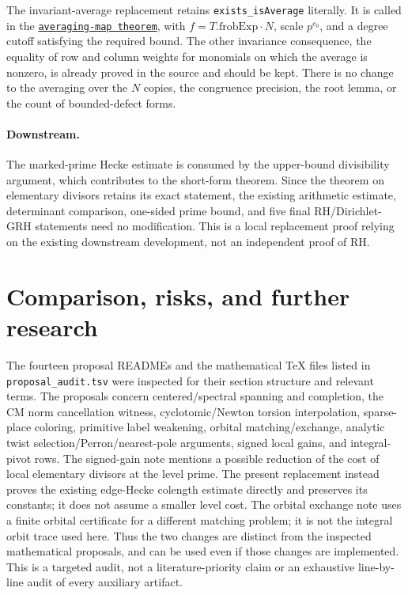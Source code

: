 \documentclass[11pt]{article}
\newcommand{\src}[1]{\texttt{#1}}
\newcommand{\anchor}[3]{\href{https://github.com/VladimirReshetnikov/ProveIt/blob/17bf37ab3b6740d5d7430065d2f2a1a2a03e8a0e/Analysis/GeneralizedRiemannHypothesis/Lean/grh/src/#1.lean\#L#2}{\texttt{#3}}}
\begin{document}
The invariant-average replacement retains \src{exists\_isAverage} literally. It is called in the \anchor{New/UpperBound/ElementaryDivisors/AveragingMap}{579}{averaging-map theorem}, with $f=T.\mathrm{frobExp}\cdot N$, scale $p^{c_0}$, and a degree cutoff satisfying the required bound. The other invariance consequence, the equality of row and column weights for monomials on which the average is nonzero, is already proved in the source and should be kept. There is no change to the averaging over the $N$ copies, the congruence precision, the root lemma, or the count of bounded-defect forms.

\paragraph{Downstream.} The marked-prime Hecke estimate is consumed by the upper-bound divisibility argument, which contributes to the short-form theorem. Since the theorem on elementary divisors retains its exact statement, the existing arithmetic estimate, determinant comparison, one-sided prime bound, and five final RH/Dirichlet-GRH statements need no modification. This is a local replacement proof relying on the existing downstream development, not an independent proof of RH.

\section{Comparison, risks, and further research}
The fourteen proposal READMEs and the mathematical TeX files listed in \src{proposal\_audit.tsv} were inspected for their section structure and relevant terms. The proposals concern centered/spectral spanning and completion, the CM norm cancellation witness, cyclotomic/Newton torsion interpolation, sparse-place coloring, primitive label weakening, orbital matching/exchange, analytic twist selection/Perron/nearest-pole arguments, signed local gains, and integral-pivot rows. The signed-gain note mentions a possible reduction of the cost of local elementary divisors at the level prime. The present replacement instead proves the existing edge-Hecke colength estimate directly and preserves its constants; it does not assume a smaller level cost. The orbital exchange note uses a finite orbital certificate for a different matching problem; it is not the integral orbit trace used here. Thus the two changes are distinct from the inspected mathematical proposals, and can be used even if those changes are implemented. This is a targeted audit, not a literature-priority claim or an exhaustive line-by-line audit of every auxiliary artifact.
\end{document}
